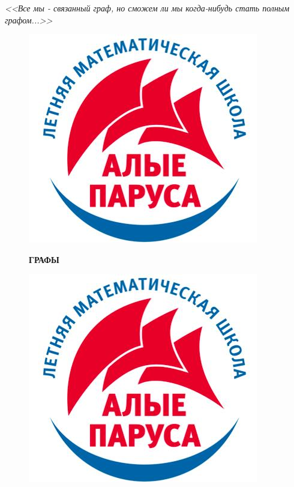 \documentclass[12 pt, a4paper]{article}%
\begin{document}
	\newpage
	\begin{flushright}
		\textit{<<Все мы - связанный граф, но сможем ли мы когда-нибудь стать полным графом...>>}
	\end{flushright}
	\begin{figure}[t]
		\begin{minipage}[h]{0.33\linewidth}
			\includegraphics[width=0.33\linewidth, left]{logo.jpg}
		\end{minipage}
		\begin{minipage}[h]{0.33\linewidth}
			\centering
			\large{\textbf{ГРАФЫ}}\\
		\end{minipage}
		\begin{minipage}[h]{0.33\linewidth}
			\includegraphics[width=0.33\linewidth, right]{logo.jpg}
		\end{minipage}
		\label{ris:image1}
	\end{figure}
	
\end{document}
